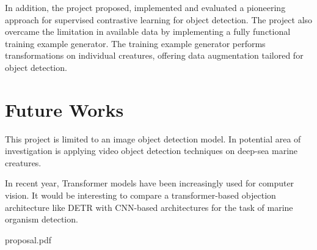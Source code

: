 \documentclass[12pt,a4paper,twoside,openany]{report}
\begin{document}
In addition, the project proposed, implemented and evaluated a pioneering approach for supervised contrastive learning for object detection. The project also overcame the limitation in available data by implementing a fully functional training example generator. The training example generator performs transformations on individual creatures, offering data augmentation tailored for object detection.

\section{Future Works}
This project is limited to an image object detection model. In potential area of investigation is applying video object detection techniques on deep-sea marine creatures.

In recent year, Transformer models have been increasingly used for computer vision. It would be interesting to compare a transformer-based objection architecture like DETR \cite{carion_end--end_2020} with CNN-based architectures for the task of marine organism detection.



\printbibliography[
heading=bibintoc,
title={Bibliography}
]

\appendix



     {proposal.pdf}
\end{document}
